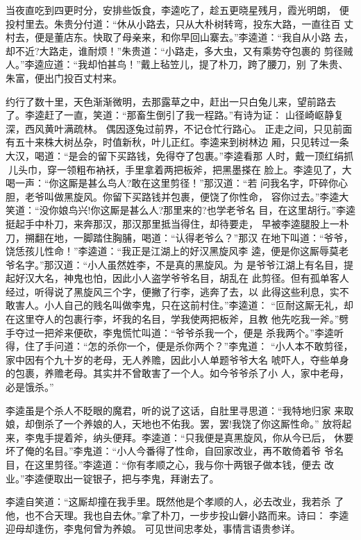 当夜直吃到四更时分，安排些饭食，李逵吃了，趁五更晓星残月，霞光明朗，
便投村里去。朱贵分付道：“休从小路去，只从大朴树转弯，投东大路，一直往百
丈村去，便是董店东。快取了母亲来，和你早回山寨去。”李逵道：“我自从小路
去，却不近?大路走，谁耐烦！”朱贵道：“小路走，多大虫，又有乘势夺包裹的
剪径贼人。”李逵应道：“我却怕甚鸟！”戴上毡笠儿，提了朴刀，跨了腰刀，别
了朱贵、朱富，便出门投百丈村来。

约行了数十里，天色渐渐微明，去那露草之中，赶出一只白兔儿来，望前路去
了。李逵赶了一直，笑道：“那畜生倒引了我一程路。”有诗为证：
山径崎岖静复深，西风黄叶满疏林。
偶因逐兔过前界，不记仓忙行路心。
正走之间，只见前面有五十来株大树丛杂，时值新秋，叶儿正红。李逵来到树林边
厢，只见转过一条大汉，喝道：“是会的留下买路钱，免得夺了包裹。”李逵看那
人时，戴一顶红绢抓儿头巾，穿一领粗布衲袄，手里拿着两把板斧，把黑墨搽在
脸上。李逵见了，大喝一声：“你这厮是甚么鸟人?敢在这里剪径！”那汉道：“若
问我名字，吓碎你心胆，老爷叫做黑旋风。你留下买路钱并包裹，便饶了你性命，
容你过去。”李逵大笑道：“没你娘鸟兴!你这厮是甚么人?那里来的?也学老爷名
目，在这里胡行。”李逵挺起手中朴刀，来奔那汉，那汉那里抵当得住，却待要走，
早被李逵腿股上一朴刀，搠翻在地，一脚踏住胸脯，喝道：“认得老爷么？”那汉
在地下叫道：“爷爷，饶恁孩儿性命！”李逵道：“我正是江湖上的好汉黑旋风李
逵，便是你这厮辱莫老爷名字。”那汉道：“小人虽然姓李，不是真的黑旋风。为
是爷爷江湖上有名目，提起好汉大名，神鬼也怕，因此小人盗学爷爷名目，胡乱在
此剪径。但有孤单客人经过，听得说了黑旋风三个字，便撇了行李，逃奔了去，以
此得这些利息，实不敢害人。小人自己的贱名叫做李鬼，只在这前村住。”李逵道：
“叵耐这厮无礼，却在这里夺人的包裹行李，坏我的名目，学我使两把板斧，且教
他先吃我一斧。”劈手夺过一把斧来便砍，李鬼慌忙叫道：“爷爷杀我一个，便是
杀我两个。”李逵听得，住了手问道：“怎的杀你一个，便是杀你两个？”李鬼道：
“小人本不敢剪径，家中因有个九十岁的老母，无人养赡，因此小人单题爷爷大名
唬吓人，夺些单身的包裹，养赡老母。其实并不曾敢害了一个人。如今爷爷杀了小
人，家中老母，必是饿杀。”

李逵虽是个杀人不眨眼的魔君，听的说了这话，自肚里寻思道：“我特地归家
来取娘，却倒杀了一个养娘的人，天地也不佑我。罢，罢!我饶了你这厮性命。”
放将起来，李鬼手提着斧，纳头便拜。李逵道：“只我便是真黑旋风，你从今已后，
休要坏了俺的名目。”李鬼道：“小人今番得了性命，自回家改业，再不敢倚着爷
爷名目，在这里剪径。”李逵道：“你有孝顺之心，我与你十两银子做本钱，便去
改业。”李逵便取出一锭银子，把与李鬼，拜谢去了。

李逵自笑道：“这厮却撞在我手里。既然他是个孝顺的人，必去改业，我若杀
了他，也不合天理。我也自去休。”拿了朴刀，一步步投山僻小路而来。诗曰：
李逵迎母却逢伤，李鬼何曾为养娘。
可见世间忠孝处，事情言语贵参详。

